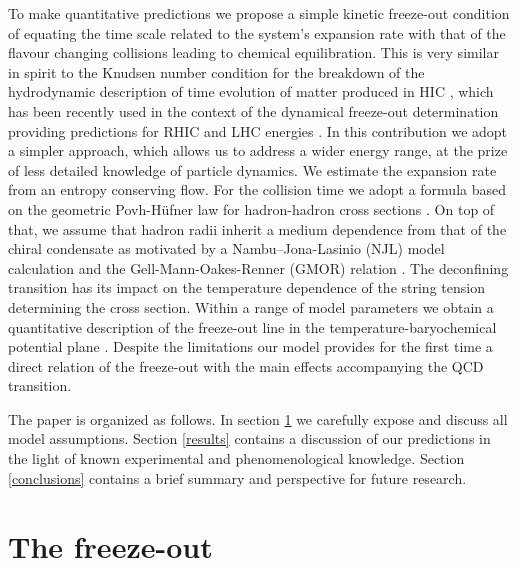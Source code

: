 \documentclass[12pt]{article}
\begin{document}
To make quantitative predictions we propose a simple kinetic freeze-out condition of equating the time scale related to the system's expansion rate with that of the flavour changing collisions \cite{Blaschke:2011ry,Blaschke:2011hm} leading to chemical equilibration.
This is very similar in spirit to the Knudsen number condition for the breakdown of the hydrodynamic description of time evolution of matter produced in HIC \cite{Niemi:2014wta,Ahmad:2016ods}, which has been recently used in the context of the dynamical freeze-out determination providing predictions 
for RHIC and LHC energies \cite{Ahmad:2016ods}. 
In this contribution we adopt a simpler approach, which allows us to address a wider energy range, at the prize of less detailed knowledge of particle dynamics.
We estimate the expansion rate from an entropy conserving flow. 
For the collision time we adopt a formula based on the geometric Povh-H{\"u}fner law for hadron-hadron cross sections \cite{Povh:1990ad,Hufner:1992cu}.
On top of that, we assume that hadron radii inherit a medium dependence from that of the chiral condensate as motivated by a Nambu--Jona-Lasinio (NJL) model calculation \cite{Hippe:1995hu} and the 
Gell-Mann-Oakes-Renner (GMOR) relation \cite{GellMann:1968rz}. 
The deconfining transition has its impact on the temperature dependence of the string tension determining the cross section. 
Within a range of model parameters we obtain a quantitative description of the freeze-out line in the temperature-baryochemical potential plane \cite{Cleymans:2005xv}.
Despite the limitations our model provides for the first time a direct relation of the freeze-out with the main effects accompanying the QCD transition.
	
The paper is organized as follows. 
In section \ref{model} we carefully expose and discuss all model assumptions.
Section \ref{results} contains a discussion of our predictions in the light of known experimental and phenomenological knowledge. 
Section \ref{conclusions} contains a brief summary and perspective for future research. 


\section{The freeze-out}
\label{model}
\end{document}
